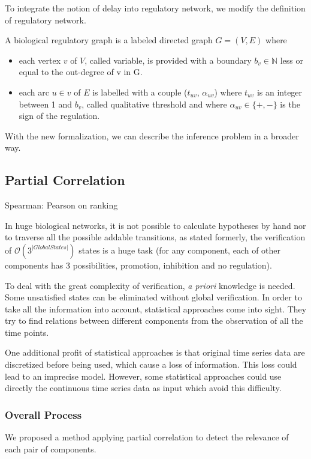 To integrate the notion of delay into regulatory network, we modify the definition of regulatory network.
\begin{definition}
A biological regulatory graph is a labeled directed graph $G=(V,E)$ where 
\begin{itemize}
    \item each vertex $v$ of $V$, called variable, is provided with a boundary $b_v\in \mathbb{N}$ less or equal to the out-degree of v in G.
    \item each arc $u\in v$ of $E$ is labelled with a couple ($t_{uv}$, $\alpha_{uv}$) where $t_{uv}$ is an integer between 1 and $b_v$, called qualitative threshold and where $\alpha_{uv}\in \{+,-\}$ is the sign of the regulation.
\end{itemize}
\end{definition}


With the new formalization, we can describe the inference problem in a broader way.



\subsection{Partial Correlation}
Spearman: Pearson on ranking

In huge biological networks, it is not possible to calculate hypotheses by hand nor to traverse all the possible addable transitions, as stated formerly, the verification of $\mathcal{O}(3^{|Global States|})$ states is a huge task (for any component, each of other components has 3 possibilities, promotion, inhibition and no regulation).
 
To deal with the great complexity of verification, \textit{a priori} knowledge is needed. 
Some unsatisfied states can be eliminated without global verification.  
In order to take all the information into account, statistical approaches come into sight.
They try to find relations between different components from the observation of all the time points.

One additional profit of statistical approaches is that original time series data are discretized before being used, which cause a loss of information.
This loss could lead to an imprecise model.
However, some statistical approaches could use directly the continuous time series data as input which avoid this difficulty.

\subsubsection{Overall Process}
We proposed a method applying partial correlation to detect the relevance of each pair of components.

